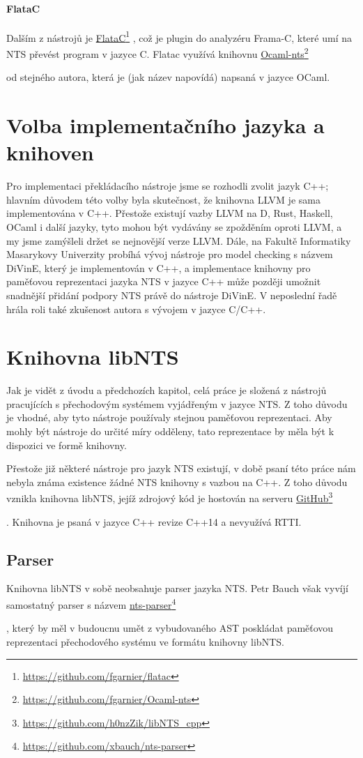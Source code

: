 \documentclass[12pt]{fithesis2}
\newcommand\fnurl[2]{%
  \href{#2}{#1}\footnote{\url{#2}}%
}
\begin{document}
\paragraph{FlataC}
Dalším z nástrojů je
\fnurl{FlataC}{https://github.com/fgarnier/flatac},
což je plugin do analyzéru Frama-C, které umí na NTS převést program v jazyce C.
Flatac využívá knihovnu
\fnurl{Ocaml-nts}{https://github.com/fgarnier/Ocaml-nts}
od stejného autora, která je (jak název napovídá) napsaná v jazyce OCaml.

\section{Volba implementačního jazyka a knihoven}
Pro implementaci překládacího nástroje jsme se rozhodli zvolit jazyk C++; hlavním důvodem této volby byla skutečnost, že knihovna LLVM je sama implementována v C++. Přestože existují vazby LLVM na D, Rust, Haskell, OCaml i další jazyky, tyto mohou být vydávány se zpožděním oproti LLVM, a my jsme zamýšleli držet se nejnovější verze LLVM. Dále, na Fakultě Informatiky Masarykovy Univerzity probíhá vývoj nástroje pro model checking s názvem DiVinE, který je implementován v C++, a implementace knihovny pro paměťovou reprezentaci jazyka NTS v jazyce C++ může později umožnit snadnější přidání podpory NTS právě do nástroje DiVinE\cite{BBH+13}. V neposlední řadě hrála roli také zkušenost autora s vývojem v jazyce C/C++.

\section{Knihovna libNTS}
Jak je vidět z úvodu a předchozích kapitol, celá práce je složená z nástrojů pracujících s přechodovým systémem vyjádřeným v jazyce NTS. Z toho důvodu je vhodné, aby tyto nástroje používaly stejnou paměťovou reprezentaci. Aby mohly být nástroje do určité míry odděleny, tato reprezentace by měla být k dispozici ve formě knihovny.

Přestože již některé nástroje pro jazyk NTS existují, v době psaní této práce nám nebyla známa existence žádné NTS knihovny s vazbou na C++. Z toho důvodu vznikla knihovna libNTS, jejíž zdrojový kód je hostován na serveru
\fnurl{GitHub}{https://github.com/h0nzZik/libNTS_cpp}
. Knihovna je psaná v jazyce C++ revize C++14 a nevyužívá RTTI.

\subsection{Parser}
Knihovna libNTS v sobě neobsahuje parser jazyka NTS. Petr Bauch však vyvíjí samostatný parser s názvem
\fnurl{nts-parser}{https://github.com/xbauch/nts-parser}
, který by měl v budoucnu umět z vybudovaného AST poskládat paměťovou reprezentaci přechodového systému ve formátu knihovny libNTS.
\end{document}
